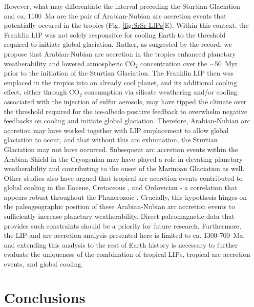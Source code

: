 However, what may differentiate the interval preceding the Sturtian Glaciation and ca. 1100~Ma are the pair of Arabian-Nubian arc accretion events that potentially occured in the tropics (Fig. \ref{fig:SrSr-LIPs}E). Within this context, the Franklin LIP was not solely responsible for cooling Earth to the threshold required to initiate global glaciation. Rather, as suggested by the \SrSr record, we propose that Arabian-Nubian arc accretion in the tropics enhanced planetary weatherability and lowered atmospheric CO$_{2}$ concentration over the $\sim$50~Myr prior to the initiation of the Sturtian Glaciation. The Franklin LIP then was emplaced in the tropics into an already cool planet, and its additional cooling effect, either through CO$_{2}$ consumption via silicate weathering and/or cooling associated with the injection of sulfur aerosols, may have tipped the climate over the threshold required for the ice-albedo positive feedback to overwhelm negative feedbacks on cooling and initiate global glaciation. Therefore, Arabian-Nubian arc accretion may have worked together with LIP emplacement to allow global glaciation to occur, and that without this arc exhumation, the Sturtian Glaciation may not have occurred. Subsequent arc accretion events within the Arabian Shield in the Cryogenian \citep{Johnson2014a} may have played a role in elevating planetary weatherability and contributing to the onset of the Marinoan Glaciation as well. Other studies also have argued that tropical arc accretion events contributed to global cooling in the Eocene, Cretaceous \citep{Jagoutz2016a}, and Ordovician \citep{Swanson-Hysell2017a} - a correlation that appears robust throughout the Phanerozoic \citep{Macdonald2019a}. Crucially, this hypothesis hinges on the paleogeographic position of these Arabian-Nubian arc accretion events to sufficiently increase planetary weatherability. Direct paleomagnetic data that provides such constraints should be a priority for future research. Furthermore, the LIP and arc accretion analysis presented here is limited to ca. 1300-700~Ma, and extending this analysis to the rest of Earth history is necessary to further evaluate the uniqueness of the combination of tropical LIPs, tropical arc accretion events, and global cooling.

\section{Conclusions}

